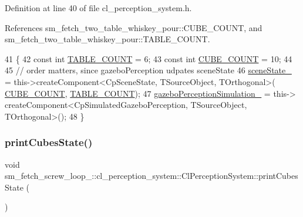 Definition at line 40 of file cl\+\_\+perception\+\_\+system.\+h.



References sm\+\_\+fetch\+\_\+two\+\_\+table\+\_\+whiskey\+\_\+pour\+::\+C\+U\+B\+E\+\_\+\+C\+O\+U\+NT, and sm\+\_\+fetch\+\_\+two\+\_\+table\+\_\+whiskey\+\_\+pour\+::\+T\+A\+B\+L\+E\+\_\+\+C\+O\+U\+NT.


\begin{DoxyCode}
41             \{
42                 \textcolor{keyword}{const} \textcolor{keywordtype}{int} \hyperlink{namespacesm__fetch__two__table__whiskey__pour_a17b0c4eed9dc45b1cdf81aeb8cab3fda}{TABLE\_COUNT} = 6;
43                 \textcolor{keyword}{const} \textcolor{keywordtype}{int} \hyperlink{namespacesm__fetch__two__table__whiskey__pour_ab6321f5657e6b4b621a9b084f81bdeb6}{CUBE\_COUNT} = 10;
44 
45                 \textcolor{comment}{// order matters, since gazeboPerception udpates sceneState}
46                 \hyperlink{classsm__fetch__screw__loop__1_1_1cl__perception__system_1_1ClPerceptionSystem_a2a9472fe3838543666bd2eea5df0f2e6}{sceneState\_} = this->createComponent<CpSceneState, TSourceObject, TOrthogonal>(
      \hyperlink{namespacesm__fetch__two__table__whiskey__pour_ab6321f5657e6b4b621a9b084f81bdeb6}{CUBE\_COUNT}, \hyperlink{namespacesm__fetch__two__table__whiskey__pour_a17b0c4eed9dc45b1cdf81aeb8cab3fda}{TABLE\_COUNT});
47                 \hyperlink{classsm__fetch__screw__loop__1_1_1cl__perception__system_1_1ClPerceptionSystem_a61f4676ea0fac7fb11a9c147b83dbbbf}{gazeboPerceptionSimulation\_} = this->
      createComponent<CpSimulatedGazeboPerception, TSourceObject, TOrthogonal>();
48             \}
\end{DoxyCode}
\mbox{\label{classsm__fetch__screw__loop__1_1_1cl__perception__system_1_1ClPerceptionSystem_afcfc92b39e72177e9917cec8642da11f}} 
\subsubsection{\texorpdfstring{print\+Cubes\+State()}{printCubesState()}}
{\footnotesize\ttfamily void sm\+\_\+fetch\+\_\+screw\+\_\+loop\+\_\+::cl\+\_\+perception\+\_\+system\+::\+Cl\+Perception\+System\+::print\+Cubes\+State (\begin{DoxyParamCaption}{ }\end{DoxyParamCaption})\hspace{0.3cm}{\ttfamily [inline]}}



